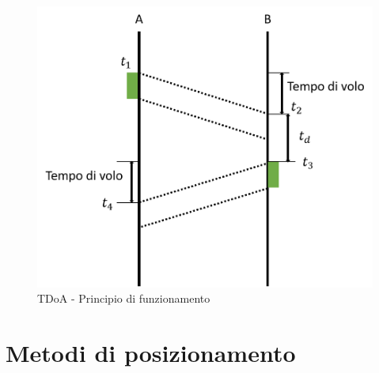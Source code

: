 \begin{figure}[H]  
	\centering 
	\includegraphics[scale=0.4]{ContestoApplicativo/toa.png}
	\caption{TDoA - Principio di funzionamento}
	\label{fig:tdoa}
\end{figure}






\section{Metodi di posizionamento}



